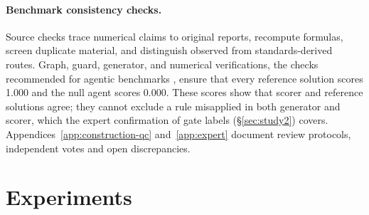 \documentclass{article}
\begin{document}
\paragraph{Benchmark consistency checks.}
Source checks trace numerical claims to original reports, recompute formulas, screen duplicate material, and distinguish observed from standards-derived routes. Graph, guard, generator, and numerical verifications, the checks recommended for agentic benchmarks \citep{zhu2025abc}, ensure that every reference solution scores 1.000 and the null agent scores 0.000. These scores show that scorer and reference solutions agree; they cannot exclude a rule misapplied in both generator and scorer, which the expert confirmation of gate labels (\S\ref{sec:study2}) covers. Appendices~\ref{app:construction-qc} and~\ref{app:expert} document review protocols, independent votes and open discrepancies.



\section{Experiments}
\label{sec:results}
\end{document}
